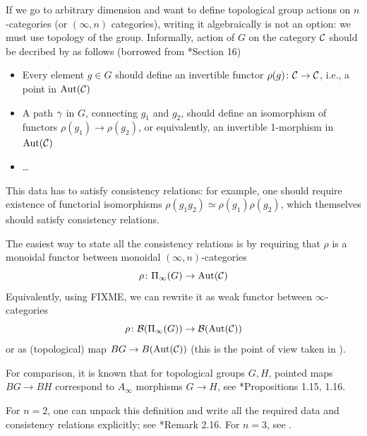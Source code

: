 

If we go to arbitrary dimension and want to define topological group actions on
$n$-categories (or $(\infty,n)$ categories), writing it algebraically is not an
option: we must use topology of the group. Informally, action of $G$ on the
category $\mathcal{C}$ should be decribed by as follows (borrowed from
*{Section 16})

\begin{itemize}
  \item Every element $g\in G$ should define an invertible functor
    $\rho(g)\colon \mathcal{C}\to \mathcal{C}$, i.e., a point in $\operatorname{Aut}(\mathcal{C})$
  \item A path $\gamma$ in $G$, connecting $g_1$ and $g_2$, should define
    an isomorphism of functors $\rho(g_1)\to \rho(g_2)$, or equivalently, an
    invertible 1-morphism in $\operatorname{Aut}(\mathcal{C})$
  \item \dots
\end{itemize}
This data has to satisfy consistency relations: for example, one should require
existence of functorial isomorphisms $\rho(g_1g_2)\simeq \rho(g_1)\rho(g_2)$,
which themselves should satisfy consistency relations.

The easiest way to state all the consistency relations is by requiring that
$\rho$ is a monoidal functor between monoidal $(\infty, n)$-categories
$$
  \rho\colon \Pi_\infty(G)\to \operatorname{Aut}(\mathcal{C})
$$
Equivalently, using FIXME, we can rewrite it as weak functor between
$\infty$-categories
$$
\rho\colon \mathcal{B}(\Pi_\infty(G) )\to \mathcal{B}(\operatorname{Aut}(\mathcal{C}))
$$
or as (topological) map $BG\to B(\operatorname{Aut}(\mathcal{C}))$
(this is the point of view taken in ).


\begin{remark}\label{r:Ainfty}
  For comparison, it is known that  for  topological groups $G,H$,
  pointed maps $BG\to BH$ correspond to $A_\infty$ morphisms $G\to H$, see
  *{Propositions 1.15, 1.16}.
\end{remark}


For $n=2$, one can unpack this definition and write all the required data
and consistency relations explicitly; see *{Remark 2.16}.
For $n=3$, see .



